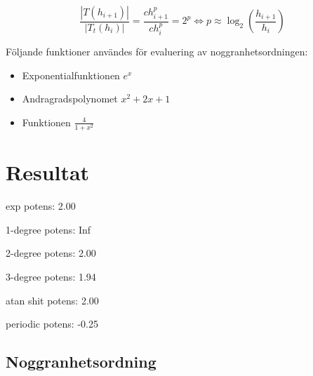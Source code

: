 \documentclass[a4paper,titlepage]{article}
\begin{document}
\begin{equation}
    \label{eq:arithmetic_complexity}
    \frac{| T(h_{i+1})|}{| T_t(h_{i})|}  = \frac{ch_{i+1}^p}{ch_{i}^p} = 2^p
    \Leftrightarrow p \approx \log_{2}\left( \frac{h_{i+1}}{h_i} \right)
\end{equation}

Följande funktioner användes för evaluering av noggranhetsordningen:

\begin{itemize}
    \item Exponentialfunktionen $e^x$
    \item Andragradspolynomet $x^2 + 2x + 1$
    \item Funktionen $\frac{4}{1 + x^2}$
\end{itemize}

\section{Resultat}


exp
potens: 2.00

1-degree
potens: Inf


2-degree
potens: 2.00


3-degree
potens: 1.94


atan shit
potens: 2.00


periodic
potens: -0.25




\subsection{Noggranhetsordning}
\end{document}
